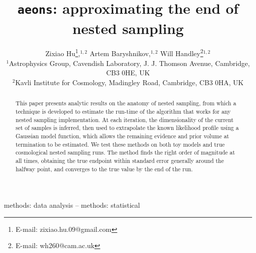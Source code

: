 \documentclass[usenatbib]{mnras}
\title[\texttt{aeons}]{\texttt{aeons}: approximating the end of nested sampling}
\author[Z. Hu et al.]{Zixiao Hu\thanks{E-mail: zixiao.hu.09@gmail.com},$^{1,2}$  Artem Baryshnikov,$^{1,2}$  Will Handley\thanks{E-mail: wh260@cam.ac.uk}$^{1,2}$
\\
$^{1}$Astrophysics Group, Cavendish Laboratory, J. J. Thomson Avenue, Cambridge, CB3 0HE, UK\\
$^{2}$Kavli Institute for Cosmology, Madingley Road, Cambridge, CB3 0HA, UK
}
\begin{document}
\label{firstpage}
\pagerange{\pageref{firstpage}--\pageref{lastpage}}
\maketitle


\begin{abstract}
    This paper presents analytic results on the anatomy of nested sampling, from which a technique is developed to estimate the run-time of the algorithm that works for any nested sampling implementation. At each iteration, the dimensionality of the current set of samples is inferred, then used to extrapolate the known likelihood profile using a Gaussian model function, which allows the remaining evidence and prior volume at termination to be estimated. We test these methods on both toy models and true cosmological nested sampling runs. The method finds the right order of magnitude at all times, obtaining the true endpoint within standard error generally around the halfway point, and converges to the true value by the end of the run.  
\end{abstract}

\begin{keywords}
methods: data analysis -- methods: statistical
\end{keywords}
\end{document}
